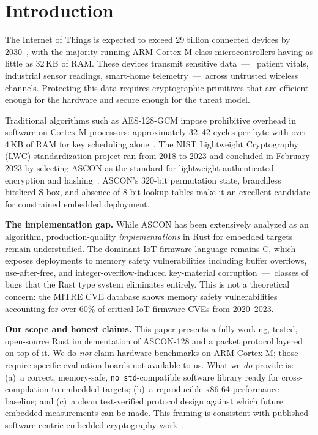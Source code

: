 \documentclass[conference]{IEEEtran}
\begin{document}
\section{Introduction}
\label{sec:intro}

The Internet of Things is expected to exceed 29\,billion connected devices by
2030~\cite{b1}, with the majority running ARM Cortex-M class microcontrollers
having as little as 32\,KB of RAM. These devices transmit sensitive data~---~
patient vitals, industrial sensor readings, smart-home telemetry~---~across
untrusted wireless channels. Protecting this data requires cryptographic
primitives that are efficient enough for the hardware and secure enough for the
threat model.

Traditional algorithms such as AES-128-GCM impose prohibitive overhead in
software on Cortex-M processors: approximately 32--42 cycles per byte with
over 4\,KB of RAM for key scheduling alone~\cite{b2}. The NIST Lightweight
Cryptography (LWC) standardization project ran from 2018 to 2023 and concluded
in February 2023 by selecting ASCON as the standard for lightweight
authenticated encryption and hashing~\cite{b5}. ASCON's 320-bit permutation
state, branchless bitsliced S-box, and absence of 8-bit lookup tables make it
an excellent candidate for constrained embedded deployment.

\textbf{The implementation gap.}
While ASCON has been extensively analyzed as an algorithm, production-quality
\emph{implementations} in Rust for embedded targets remain understudied. The
dominant IoT firmware language remains C, which exposes deployments to memory
safety vulnerabilities including buffer overflows, use-after-free, and
integer-overflow-induced key-material corruption~---~classes of bugs that the
Rust type system eliminates entirely. This is not a theoretical concern: the
MITRE CVE database shows memory safety vulnerabilities accounting for over 60\%
of critical IoT firmware CVEs from 2020--2023.

\textbf{Our scope and honest claims.}
This paper presents a fully working, tested, open-source Rust implementation
of ASCON-128 and a packet protocol layered on top of it. We do
\emph{not} claim hardware benchmarks on ARM Cortex-M; those require specific
evaluation boards not available to us. What we \emph{do} provide is:
(a)~a correct, memory-safe, \texttt{no\_std}-compatible software library
ready for cross-compilation to embedded targets; (b)~a reproducible x86-64
performance baseline; and (c)~a clean test-verified protocol design against
which future embedded measurements can be made. This framing is consistent
with published software-centric embedded cryptography work~\cite{b10,b11}.
\end{document}
